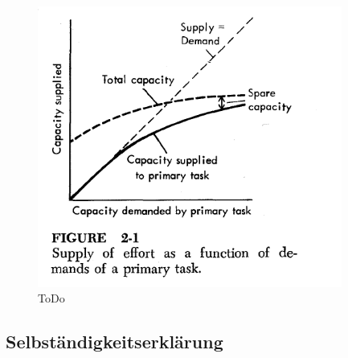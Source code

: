 \documentclass{llncs}					%
\begin{document}
\begin{figure}[htbp]
	\begin{center}
		\includegraphics[width = 10cm]{Grafiken/28-Attetntion-Reserves.png}
		\caption{ToDo}
		\label{28-Attetntion-Reserves}
	\end{center}
\end{figure}


\subsection{Selbständigkeitserklärung}

\clearpage

\end{document}
